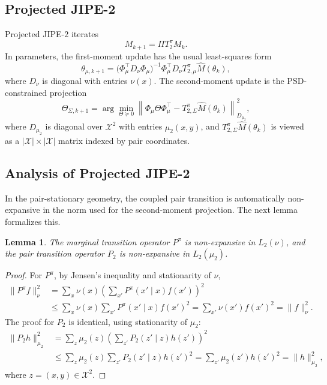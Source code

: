 \documentclass[accepted]{uai2026}
\theoremstyle{plain}
\newtheorem{lemma}[theorem]{Lemma}
\theoremstyle{definition}
\theoremstyle{remark}
\newcommand{\1}{\mathbbm{1}}
\begin{document}
\subsection{Projected JIPE-2}
Projected JIPE-$2$ iterates
\begin{equation}
M_{k+1}=\Pi T^\pi_2 M_k.
\end{equation}
In parameters, the first-moment update has the usual least-squares form
\begin{equation}
\theta_{\mu,k+1} = \big(\Phi_\mu^\top D_\nu\Phi_\mu\big)^{-1} \Phi_\mu^\top D_\nu T^\pi_{2,\mu}\hat{M}(\theta_k),
\end{equation}
where $D_\nu$ is diagonal with entries $\nu(x)$. The second-moment update is the PSD-constrained projection
\begin{equation}
\Theta_{\Sigma,k+1} = \arg\min_{\Theta\succeq 0} \left\|\Phi_\mu\Theta\Phi_\mu^\top - T^\pi_{2,\Sigma}\hat{M}(\theta_k)\right\|_{D_{\mu_2}}^2,
\end{equation}
where $D_{\mu_2}$ is diagonal over $\mathcal{X}^2$ with entries $\mu_2(x,y)$, and $T^\pi_{2,\Sigma}\hat{M}(\theta_k)$ is viewed as a $|\mathcal{X}|\times|\mathcal{X}|$ matrix indexed by pair coordinates.

\subsection{Analysis of Projected JIPE-2}
In the pair-stationary geometry, the coupled pair transition is automatically non-expansive in the norm used for the second-moment projection. The next lemma formalizes this.

\begin{lemma}\label{lem:non-expansive}
The marginal transition operator $P^\pi$ is non-expansive in $L_2(\nu)$, and the pair transition operator $P_2$ is non-expansive in $L_2(\mu_2)$.
\end{lemma}
\begin{proof}
For $P^\pi$, by Jensen's inequality and stationarity of $\nu$,
\begin{equation}
\begin{split}
\|P^\pi f\|_\nu^2 &= \sum_x\nu(x)\left(\sum_{x'}P^\pi(x'\mid x)f(x')\right)^2\\
&\le \sum_x\nu(x)\sum_{x'}P^\pi(x'\mid x)f(x')^2 = \sum_{x'}\nu(x')f(x')^2 = \|f\|_\nu^2.
\end{split}
\end{equation}
The proof for $P_2$ is identical, using stationarity of $\mu_2$:
\begin{equation}
\begin{split}
\|P_2 h\|_{\mu_2}^2 &= \sum_z\mu_2(z)\left(\sum_{z'}P_2(z'\mid z)h(z')\right)^2 \\
&\le \sum_z\mu_2(z)\sum_{z'}P_2(z'\mid z)h(z')^2 = \sum_{z'}\mu_2(z')h(z')^2 =\|h\|_{\mu_2}^2,
\end{split}
\end{equation}
where $z=(x,y)\in\mathcal{X}^2$.
\end{proof}
\end{document}
